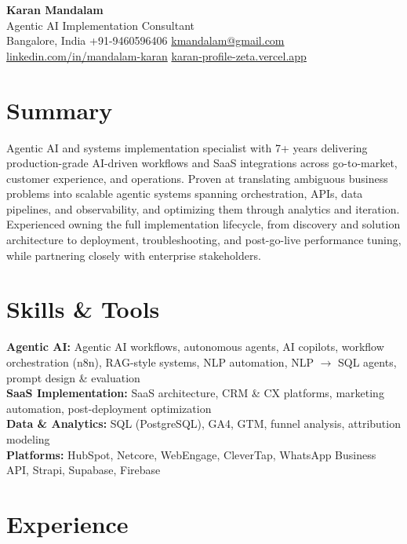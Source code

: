 \documentclass[10pt,a4paper]{article}
\begin{document}
\fontsize{10pt}{11.5pt}\selectfont

\begin{center}
{\LARGE \textbf{Karan Mandalam}} \\[4pt]
Agentic AI Implementation Consultant \\
Bangalore, India \textbar{} +91-9460596406 \textbar{} \href{mailto:kmandalam@gmail.com}{kmandalam@gmail.com} \\
\href{https://linkedin.com/in/mandalam-karan}{linkedin.com/in/mandalam-karan} \textbar{} \href{https://karan-profile-zeta.vercel.app}{karan-profile-zeta.vercel.app}
\end{center}

\section*{Summary}
Agentic AI and systems implementation specialist with 7+ years delivering production-grade AI-driven workflows and SaaS integrations across go-to-market, customer experience, and operations. Proven at translating ambiguous business problems into scalable agentic systems spanning orchestration, APIs, data pipelines, and observability, and optimizing them through analytics and iteration. Experienced owning the full implementation lifecycle, from discovery and solution architecture to deployment, troubleshooting, and post-go-live performance tuning, while partnering closely with enterprise stakeholders.

\section*{Skills \& Tools}
\textbf{Agentic AI:} Agentic AI workflows, autonomous agents, AI copilots, workflow orchestration (n8n), RAG-style systems, NLP automation, NLP $\rightarrow$ SQL agents, prompt design \& evaluation \\
\textbf{SaaS Implementation:} SaaS architecture, CRM \& CX platforms, marketing automation, post-deployment optimization \\
\textbf{Data \& Analytics:} SQL (PostgreSQL), GA4, GTM, funnel analysis, attribution modeling \\
\textbf{Platforms:} HubSpot, Netcore, WebEngage, CleverTap, WhatsApp Business API, Strapi, Supabase, Firebase

\section*{Experience}
\end{document}
